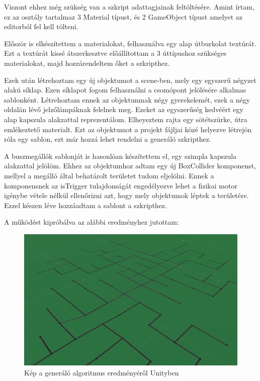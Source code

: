Viszont ehhez még szükség van a szkript adattagjainak feltöltésére. Amint írtam, ez az osztály tartalmaz 3 Material típust, és 2 GameObject típust amelyet az editorból fel kell tölteni. 

Először is elkészítettem a materialokat, felhasználva egy alap útburkolat textúrát. Ezt a textúrát kissé átszerkesztve előállítottam a 3 úttípushoz szükséges materialokat, majd hozzárendeltem őket a szkripthez.

Ezek után létrehoztam egy új objektumot a scene-ben, mely egy egyszerű négyzet alakú síklap. Ezen síklapot fogom felhasználni a csomópont jelölésére alkalmas sablonként. Létrehoztam ennek az objektumnak négy gyerekelemét, ezek a négy oldalán lévő jelzőlámpáknak felelnek meg. Ezeket az egyszerűség kedvéért egy alap kapszula alakzattal reprezentálom. Elheyeztem rajta egy sötétszürke, útra emlékeztető materialt. Ezt az objektumot a projekt fájljai közé helyezve létrejön róla egy sablon, ezt már hozzá lehet rendelni a generáló szkripthez.

A buszmegállók sablonját is hasonlóan készítettem el, egy szimpla kapszula alakzattal jelölöm. Ehhez az objektumhoz adtam egy új BoxCollider komponenst, mellyel a megálló által behatárolt területet tudom eljelölni. Ennek a komponensnek az isTrigger tulajdonságát engedélyezve lehet a fizikai motor igénybe vétele nélkül ellenőrizni azt, hogy mely objektumok léptek a területére. Ezzel készen léve hozzáadtam a sablont a szkripthez.

A működést kipróbálva az alábbi eredményhez jutottam:
\begin{figure}[H]
\includegraphics[width=\linewidth]{unitygraph.png}
\caption{Kép a generáló algoritmus eredményéről Unityben}
\label{fig:ugraph}
\end{figure}
